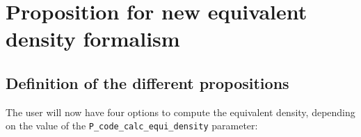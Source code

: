 \documentclass[]{book}
\begin{document}
\hypertarget{proposition-for-new-equivalent-density-formalism}{%
\section{Proposition for new equivalent density formalism}\label{proposition-for-new-equivalent-density-formalism}}

\hypertarget{definition-of-the-different-propositions}{%
\subsection{Definition of the different propositions}\label{definition-of-the-different-propositions}}

The user will now have four options to compute the equivalent density, depending on the value of the \texttt{P\_code\_calc\_equi\_density} parameter:
\end{document}
